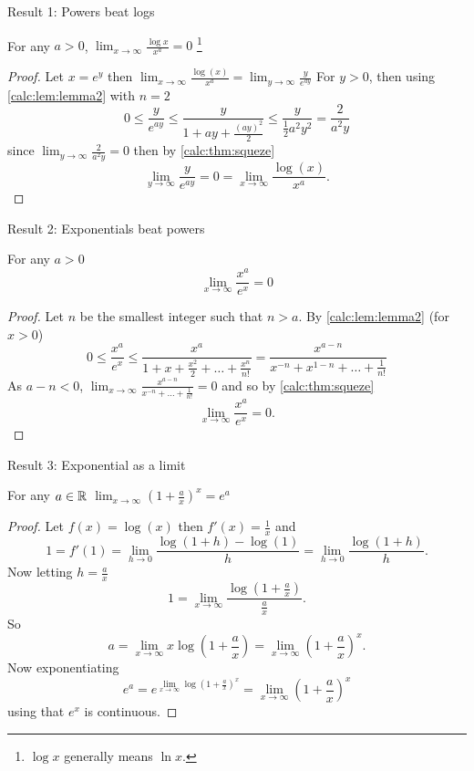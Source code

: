 \documentclass[10pt, a4paper]{article}
\begin{document}
Result 1: Powers beat logs

For any $a > 0$, $\displaystyle\lim_{x \rightarrow \infty}\frac{\log x}{x ^ a} = 0$
\footnote{$\log x$ generally means $\ln x$.}
\begin{proof}
    Let $x = e ^ y$ then $\displaystyle\lim_{x \rightarrow \infty}\frac{\log(x)}{x ^ a} = \lim_{y \rightarrow \infty}\frac{y}{e ^ {ay}}$
    For $y > 0$,
    then using \autoref{calc:lem:lemma2} with $n = 2$
    \[
    0 \leq \frac{y}{e ^ {ay}} \leq \frac{y}{1 + ay + \frac{(ay) ^ 2}{2}} \leq \frac{y}{\frac{1}{2}a ^ 2 y ^ 2} = \frac{2}{a ^ 2 y}
    \]
    since $\lim_{y \rightarrow \infty}\frac{2}{a ^ 2y} = 0$ then by \autoref{calc:thm:squeze}
    \[
    \lim_{y \rightarrow \infty}\frac{y}{e ^ {ay}} = 0 = \lim_{x \rightarrow \infty}\frac{\log(x)}{x ^ a}.
    \]
\end{proof}

Result 2: Exponentials beat powers

For any $a > 0$
\[
\lim_{x \rightarrow \infty}\frac{x ^ a}{e ^ x} = 0
\]
\begin{proof}
    Let $n$ be the smallest integer such that $n > a$.
    By \autoref{calc:lem:lemma2} (for $x > 0$)
    \[
    0 \leq \frac{x ^ a}{e ^ x} \leq \frac{x ^ a}{1 + x + \frac{x ^ 2}{2} + \dotsc + \frac{x ^ n}{n!}} = \frac{x ^ {a - n}}{x ^ {-n} + x ^ {1 - n} + \dotsc + \frac{1}{n!}}
    \]
    As $a - n < 0$,
    $\displaystyle\lim_{x \rightarrow \infty}\frac{x ^ {a - n}}{x ^ {-n} + \dotsc + \frac{1}{n!}} = 0$
    and so by \autoref{calc:thm:squeze}
    \[
    \lim_{x \rightarrow \infty}\frac{x ^ a}{e ^ x} = 0.
    \]
\end{proof}

Result 3: Exponential as a limit

For any $a \in \mathbb{R}$ $\displaystyle\lim_{x \rightarrow \infty}\left(1 + \frac{a}{x}\right) ^ x = e ^ a$
\begin{proof}
    Let $f(x) = \log(x)$ then $f'(x) = \frac{1}{x}$ and
    \[
    1 = f'(1) = \lim_{h \rightarrow 0}\frac{\log(1 + h) - \log(1)}{h} = \lim_{h \rightarrow 0}\frac{\log(1 + h)}{h}.
    \]
    Now letting $h = \frac{a}{x}$
    \[
    1 = \lim_{x \rightarrow \infty}\frac{\log\left(1 + \frac{a}{x}\right)}{\frac{a}{x}}.
    \]
    So
    \[
    a = \lim_{x \rightarrow \infty}x\log\left(1 + \frac{a}{x}\right) = \lim_{x \rightarrow \infty}\left(1 + \frac{a}{x}\right) ^ x.
    \]
    Now exponentiating
    \[
    e ^ a = e ^ {\lim_{x \rightarrow \infty}\log\left(1 + \frac{a}{x}\right) ^ x} = \lim_{x \rightarrow \infty}\left(1 + \frac{a}{x}\right) ^ x
    \]
    using that $e ^ x$ is continuous.
\end{proof}
\end{document}

